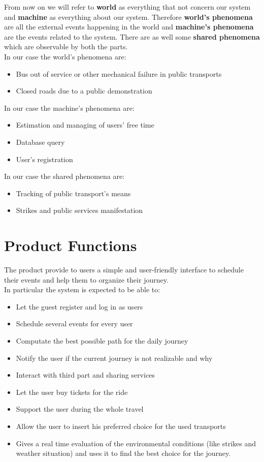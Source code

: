 \documentclass[numbers=noenddot, 12pt, a4paper, oneside]{scrbook}
\begin{document}
From now on we will refer to \textbf{world} as everything that not concern our system and \textbf{machine} as everything about our system. Therefore \textbf{world's phenomena} are all the external events happening in the world and \textbf{machine's phenomena} are the events related to the system. There are as well some \textbf{shared phenomena} which are observable by both the parts.\\

In our case the world's phenomena are:
\begin{itemize}
	\item Bus out of service or other mechanical failure in public transports
	\item Closed roads due to a public demonstration
\end{itemize}
In our case the machine's phenomena are:
\begin{itemize}
	\item Estimation and managing of users' free time 
	\item Database query
	\item User's registration
\end{itemize}
In our case the shared phenomena are:
\begin{itemize}
	\item Tracking of public transport's means
	\item Strikes and public services manifestation
\end{itemize}


\section{Product Functions}

The product provide to users a simple and user-friendly interface to schedule their events and help them to organize their journey.\\

In particular the system is expected to be able to:
\begin{itemize}
	\item Let the guest register and log in as users
	\item Schedule several events for every user
	\item Computate the best possible path for the daily journey
	\item Notify the user if the current journey is not realizable and why
	\item Interact with third part and sharing services 
	\item Let the user buy tickets for the ride
	\item Support the user during the whole travel
	\item Allow the user to insert his preferred choice for the used transports
	\item Gives a real time evaluation of the environmental conditions (like strikes and weather situation) and uses it to find the best choice for the journey.
\end{itemize}
\end{document}

